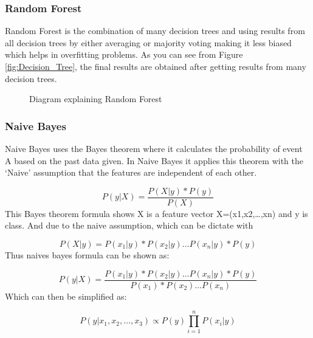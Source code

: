 \documentclass[12pt,oneside,openright,a4paper]{cpe-english-project}
\begin{document}
        \subsubsection{Random Forest}
          \qquad Random Forest is the combination of many decision trees and using results from all decision trees by either averaging or majority voting making it less biased which helps in overfitting problems. As you can see from Figure \ref{fig:Decision_Tree}, the final results are obtained after getting results from many decision trees.\par
          \begin{figure}[!h]
            \centering
            \caption{Diagram explaining Random Forest}\label{fig:Random_Forest}
          \end{figure}
        \subsubsection{Naive Bayes}
          \qquad Naive Bayes uses the Bayes theorem where it calculates the probability of event A based on the past data given. In Naive Bayes it applies this theorem with the ‘Naive’ assumption that the features are independent of each other.\cite{NaïveBayes1, NaïveBayes2}\par 
          \begin{equation}
            P(y|X) = \frac{P(X|y) * P(y)}{P(X)}
          \end{equation}
          \qquad This Bayes theorem formula shows X is a feature vector  X=(x1,x2,…,xn) and y is class. And due to the naive assumption, which can be dictate with \par
          \begin{equation}
            P(X|y) = P(x_1|y) * P(x_2|y) \ldots P(x_n|y) * P(y)
          \end{equation}
          \qquad Thus naives bayes formula can be shown as: \par
          \begin{equation}
            P(y|X) = \frac{P(x_1|y) * P(x_2|y) \ldots P(x_n|y) * P(y)}{P(x_1) * P(x_2) \ldots P(x_n)}
          \end{equation}
          \qquad Which can then be simplified as: \par
          \begin{equation}
            P(y|x_1,x_2,\ldots,x_3) \propto P(y) \prod\limits_{i=1}^{n} P(x_i|y)
          \end{equation}
\end{document}

